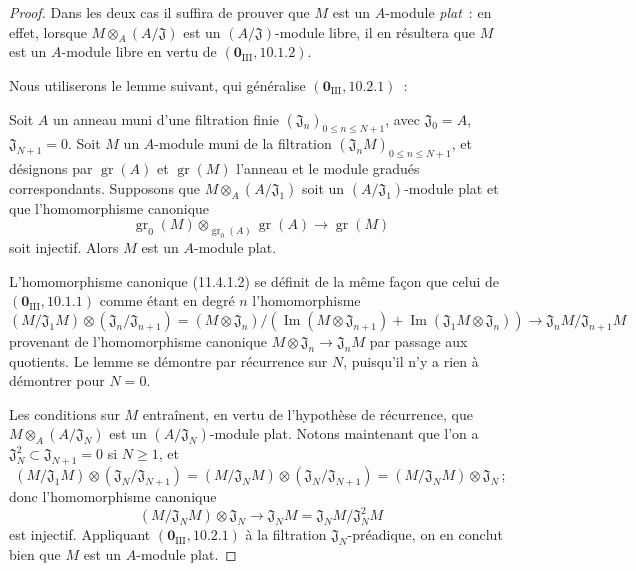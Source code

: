 \begin{proof}
Dans les deux cas il suffira de prouver que $M$ est un $A$-module \emph{plat}~:
en effet, lorsque $M\otimes_A(A/\mathfrak J)$ est un
$(A/\mathfrak J)$-module libre, il en résultera que $M$ est un $A$-module libre
en vertu de $(\mathbf 0_{\mathrm{III}},10.1.2)$.

Nous utiliserons le lemme suivant, qui généralise
$(\mathbf 0_{\mathrm{III}},10.2.1)$~:

\begin{lemma}[11.4.1.1]
\label{IV.11.4.1.1-fr}
Soit $A$ un anneau muni d'une filtration finie
$(\mathfrak J_n)_{0\leq n\leq N+1}$, avec $\mathfrak J_0=A$,
$\mathfrak J_{N+1}=0$. Soit $M$ un $A$-module muni de la filtration
$(\mathfrak J_nM)_{0\leq n\leq N+1}$, et désignons par
$\operatorname{gr}(A)$ et $\operatorname{gr}(M)$ l'anneau et le module gradués
correspondants. Supposons que $M\otimes_A(A/\mathfrak J_1)$ soit un
$(A/\mathfrak J_1)$-module plat et que l'homomorphisme canonique
\begin{equation}
\operatorname{gr}_0(M)\otimes_{\operatorname{gr}_0(A)}\operatorname{gr}(A)
\longrightarrow\operatorname{gr}(M)
\label{IV.11.4.1.2-fr}
\tag{11.4.1.2}
\end{equation}
soit injectif. Alors $M$ est un $A$-module plat.
\end{lemma}

L'homomorphisme canonique (11.4.1.2) se définit de la même façon que celui de
$(\mathbf 0_{\mathrm{III}},10.1.1)$ comme étant en degré $n$ l'homomorphisme
\[
(M/\mathfrak J_1M)\otimes(\mathfrak J_n/\mathfrak J_{n+1})
=(M\otimes\mathfrak J_n)/
(\operatorname{Im}(M\otimes\mathfrak J_{n+1})
+\operatorname{Im}(\mathfrak J_1M\otimes\mathfrak J_n))
\longrightarrow\mathfrak J_nM/\mathfrak J_{n+1}M
\]
provenant de l'homomorphisme canonique $M\otimes\mathfrak J_n\to\mathfrak J_nM$
par passage aux quotients. Le lemme se démontre par récurrence sur $N$,
puisqu'il n'y a rien à démontrer pour $N=0$.


Les conditions sur $M$ entraînent, en vertu de l'hypothèse de récurrence, que
$M\otimes_A(A/\mathfrak J_N)$ est un $(A/\mathfrak J_N)$-module plat. Notons
maintenant que l'on a $\mathfrak J_N^2\subset\mathfrak J_{N+1}=0$ si $N\geq1$,
et
\[
(M/\mathfrak J_1M)\otimes(\mathfrak J_N/\mathfrak J_{N+1})
=(M/\mathfrak J_NM)\otimes(\mathfrak J_N/\mathfrak J_{N+1})
=(M/\mathfrak J_NM)\otimes\mathfrak J_N\,;
\]
donc l'homomorphisme canonique
\[
(M/\mathfrak J_NM)\otimes\mathfrak J_N
\longrightarrow\mathfrak J_NM=\mathfrak J_NM/\mathfrak J_N^2M
\]
est injectif. Appliquant $(\mathbf 0_{\mathrm{III}},10.2.1)$ à la filtration
$\mathfrak J_N$-préadique, on en conclut bien que $M$ est un $A$-module plat.


\end{proof}
